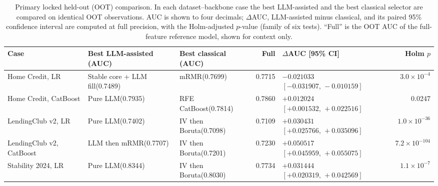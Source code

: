 \documentclass[final,5p,twocolumn]{elsarticle}
\begin{document}
\begin{table}[htbp]
\centering
\scriptsize
\setlength{\tabcolsep}{3pt}
\begin{threeparttable}
\caption{Primary locked held-out (OOT) comparison. In each dataset--backbone case the best LLM-assisted and the best classical selector are compared on identical OOT observations. AUC is shown to four decimals; $\Delta$AUC, LLM-assisted minus classical, and its paired 95\% confidence interval are computed at full precision, with the Holm-adjusted $p$-value (family of six tests). ``Full'' is the OOT AUC of the full-feature reference model, shown for context only.}
\label{tab:primary_results}
\begin{tabular}{@{}L{21mm}L{25mm}L{22mm}rL{36mm}r@{}}
\toprule
Case & Best LLM-assisted (AUC) & Best classical (AUC) & Full & $\Delta$AUC [95\% CI] & Holm $p$ \\
\midrule
Home Credit, LR & Stable core + LLM fill\newline (0.7489) & mRMR\newline (0.7699) & 0.7715 & $-0.021033$\newline $[-0.031907,\,-0.010159]$ & $3.0\times10^{-4}$ \\
\addlinespace
Home Credit, CatBoost & Pure LLM\newline (0.7935) & RFE CatBoost\newline (0.7814) & 0.7860 & $+0.012024$\newline $[+0.001532,\,+0.022516]$ & 0.0247 \\
\addlinespace
LendingClub v2, LR & Pure LLM\newline (0.7402) & IV then Boruta\newline (0.7098) & 0.7109 & $+0.030431$\newline $[+0.025766,\,+0.035096]$ & $1.0\times10^{-36}$ \\
\addlinespace
LendingClub v2, CatBoost & LLM then mRMR\newline (0.7707) & IV then Boruta\newline (0.7201) & 0.7230 & $+0.050517$\newline $[+0.045959,\,+0.055075]$ & $7.2\times10^{-104}$ \\
\addlinespace
Stability 2024, LR & Pure LLM\newline (0.8344) & IV then Boruta\newline (0.8030) & 0.7734 & $+0.031444$\newline $[+0.020319,\,+0.042569]$ & $1.1\times10^{-7}$ \\

\end{tabular}
\end{threeparttable}
\end{table}
\end{document}
